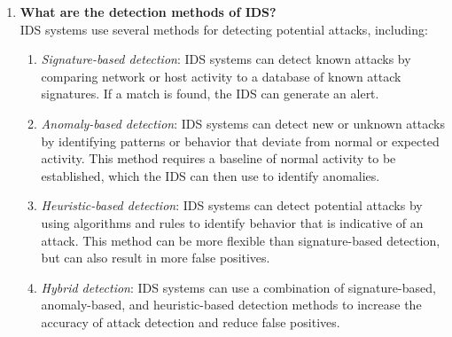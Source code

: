 \documentclass[11pt]{article}
\begin{document}
\begin{enumerate}
    \item \textbf{What are the detection methods of IDS?}\\
          IDS systems use several methods for detecting potential attacks, including:
          \begin{enumerate}
              \item \textit{Signature-based detection}: IDS systems can detect known attacks by comparing network or host activity to a database of known attack signatures. If a match is found, the IDS can generate an alert.
              \item \textit{Anomaly-based detection}: IDS systems can detect new or unknown attacks by identifying patterns or behavior that deviate from normal or expected activity. This method requires a baseline of normal activity to be established, which the IDS can then use to identify anomalies.
              \item \textit{Heuristic-based detection}: IDS systems can detect potential attacks by using algorithms and rules to identify behavior that is indicative of an attack. This method can be more flexible than signature-based detection, but can also result in more false positives.
              \item \textit{Hybrid detection}: IDS systems can use a combination of signature-based, anomaly-based, and heuristic-based detection methods to increase the accuracy of attack detection and reduce false positives.
          \end{enumerate}


\end{enumerate}
\end{document}
